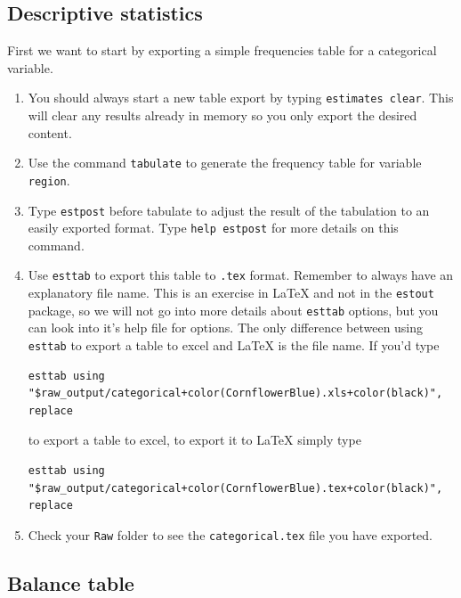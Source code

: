 \documentclass[]{article}
\begin{document}
\subsection{Descriptive statistics}

First we want to start by exporting a simple frequencies table for a categorical variable. 

\begin{enumerate}
	\item You should always start a new table export by typing \texttt{estimates clear}. This will clear any results already in memory so you only export the desired content.
	\item Use the command \texttt{tabulate} to generate the frequency table for variable \texttt{region}.
	\item Type \texttt{estpost} before tabulate to adjust the result of the tabulation to an easily exported format. Type \texttt{help estpost} for more details on this command.
	\item Use \texttt{esttab} to export this table to \texttt{.tex} format. Remember to always have an explanatory file name. This is an exercise in {\LaTeX} and not in the \texttt{estout} package, so we will not go into more details about \texttt{esttab} options, but you can look into it's help file for options. The only difference between using \texttt{esttab} to export a table to excel and {\LaTeX} is the file name. If you'd type 
	
	\begin{Verbatim}[commandchars=+\(\)]
	esttab using "$raw_output/categorical+color(CornflowerBlue).xls+color(black)", replace
	\end{Verbatim}
	
	to export a table to excel, to export it to {\LaTeX} simply type 
	
	\begin{Verbatim}[commandchars=+\(\)]
	esttab using "$raw_output/categorical+color(CornflowerBlue).tex+color(black)", replace
	\end{Verbatim}
	
	\item Check your \texttt{Raw} folder to see the \texttt{categorical.tex} file you have exported.
\end{enumerate}

\subsection{Balance table}
\end{document}
